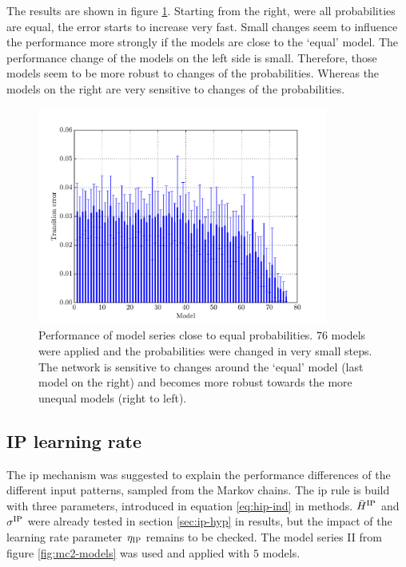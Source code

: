The results are shown in figure \ref{fig:mc2b-performance}. Starting from the right, were all probabilities are equal, the error starts to increase very fast. Small changes seem to influence the performance more strongly if the models are close to the `equal' model. The performance change of the models on the left side is small. Therefore, those models seem to be more robust to changes of the probabilities. Whereas the models on the right are very sensitive to changes of the probabilities.

\begin{figure}[p]
	\centering
	\includegraphics[width=0.85\textwidth]{appendix/mc2b_performance_distances}
	\caption[Performance of model series close to equal probabilities]{Performance of model series close to equal probabilities. $76$ models were applied and the probabilities were changed in very small steps. The network is sensitive to changes around the `equal' model (last model on the right) and becomes more robust towards the more unequal models (right to left).}
	\label{fig:mc2b-performance}
\end{figure}

\clearpage

\subsection{IP learning rate}
\label{sec:appendix:eta}

The \acs{ip} mechanism was suggested to explain the performance differences of the different input patterns, sampled from the Markov chains. The \acl{ip} rule is build with three parameters, introduced in equation \eqref{eq:hip-ind} in methods. $\bar H^{\text{IP}}$ and $\sigma^{\text{IP}}$ were already tested in section \ref{sec:ip-hyp} in results, but the impact of the learning rate parameter $\eta_{\text{IP}}$ remains to be checked. The model series II from figure \ref{fig:mc2-models} was used and applied with $5$ models.


